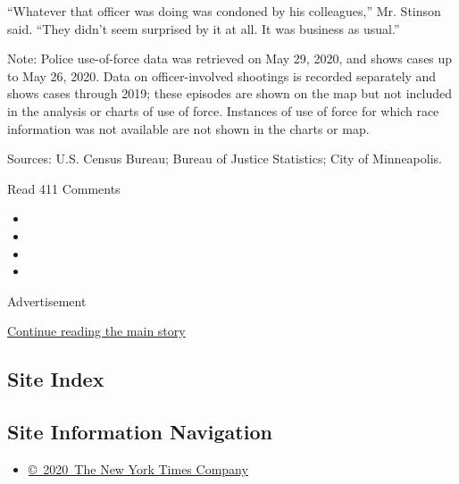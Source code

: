 ``Whatever that officer was doing was condoned by his colleagues,'' Mr.
Stinson said. ``They didn't seem surprised by it at all. It was business
as usual.''

Note: Police use-of-force data was retrieved on May 29, 2020, and shows
cases up to May 26, 2020. Data on officer-involved shootings is recorded
separately and shows cases through 2019; these episodes are shown on the
map but not included in the analysis or charts of use of force.
Instances of use of force for which race information was not available
are not shown in the charts or map.

Sources: U.S. Census Bureau; Bureau of Justice Statistics; City of
Minneapolis.

Read 411 Comments

\begin{itemize}
\item
\item
\item
\item
\end{itemize}

Advertisement

\protect\hyperlink{after-bottom}{Continue reading the main story}

\hypertarget{site-index}{%
\subsection{Site Index}\label{site-index}}

\hypertarget{site-information-navigation}{%
\subsection{Site Information
Navigation}\label{site-information-navigation}}

\begin{itemize}
\tightlist
\item
  \href{https://help.nytimes3xbfgragh.onion/hc/en-us/articles/115014792127-Copyright-notice}{©~2020~The
  New York Times Company}
\end{itemize}

